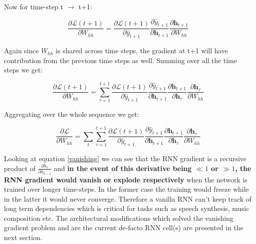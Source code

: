 Now for time-step t $\rightarrow$ t+1:

\begin{equation}
\frac{\partial \mathbf{\mathcal{L}}\left(t+1\right)}{\partial W_{hh}} = \frac{\partial \mathbf{\mathcal{L}}\left(t+1\right)}{\partial \hat{y}_{t+1}} \frac{\partial  \hat{y}_{t+1}}{\partial \mathbf{h}_{t+1}} \frac{\partial \mathbf{h}_{t+1}}{\partial W_{hh}}
\end{equation}

Again since $W_{hh}$ is shared across time steps, the gradient at t+1 will have contribution from the previous time steps as well. Summing over all the time steps we get:


\begin{equation}
\frac{\partial \mathbf{\mathcal{L}}\left(t+1\right)}{\partial W_{hh}} = \sum_{\tau=1}^{t+1}\frac{\partial \mathbf{\mathcal{L}}\left(t+1\right)}{\partial \hat{y}_{t+1}} \frac{\partial  \hat{y}_{t+1}}{\partial \mathbf{h}_{t+1}} \frac{\partial \mathbf{h}_{t+1}}{\partial \mathbf{h}_{\tau}} \frac{\partial \mathbf{h}_{\tau}}{\partial W_{hh}}
\end{equation}

Aggregating over the whole sequence we get:

\begin{equation} \label{vanishing}
\frac{\partial \mathbf{\mathcal{L}}}{\partial W_{hh}} = \sum_{t}\sum_{\tau=1}^{t+1}\frac{\partial \mathbf{\mathcal{L}}\left(t+1\right)}{\partial \hat{y}_{t+1}} \frac{\partial  \hat{y}_{t+1}}{\partial \mathbf{h}_{t+1}} \frac{\partial \mathbf{h}_{t+1}}{\partial \mathbf{h}_{\tau}} \frac{\partial \mathbf{h}_{\tau}}{\partial W_{hh}}
\end{equation}

Looking at equation \ref{vanishing} we can see that the RNN gradient is a recursive product of $\frac{\partial h_t}{\partial h_{t-1}}$ and \textbf{in the event of this derivative being $\ll 1$ or $\gg 1$, the RNN gradient would vanish or explode respectively} when the network is trained over longer time-steps. In the former case the training would freeze while in the latter it would never converge. Therefore a vanilla RNN can't keep track of long term dependencies which is critical for tasks such as speech synthesis, music composition etc. The architectural modifications which solved the vanishing gradient problem and are the current de-facto RNN cell(s) are presented in the next section.

